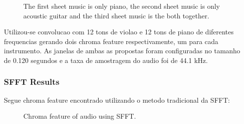 \documentclass{article}
\begin{document}
	\begin{figure}[h]
	 \centerline{}
	 \centerline{}
	 \centerline{}
	 \caption{The first sheet music is only piano, the second sheet music is only acoustic guitar and the third sheet music is the both together.}
	 \label{fig:1-ssft}
	\end{figure}

Utilizou-se convolucao com 12 tons de violao e 12 tons de piano de diferentes frequencias gerando dois chroma feature respectivamente, um para cada instrumento. As janelas de ambas as propostas foram configuradas no tamanho de 0.120 segundos e a taxa de amostragem do audio foi de 44.1 kHz.

	\subsubsection{SFFT Results}
	Segue chroma feature encontrado utilizando o metodo tradicional da SFFT:
	
	\begin{figure}[h]
	 \centerline{}
	 \caption{Chroma feature of audio using SFFT.}
	 \label{fig:2-ssft}
	\end{figure}	
\end{document}
